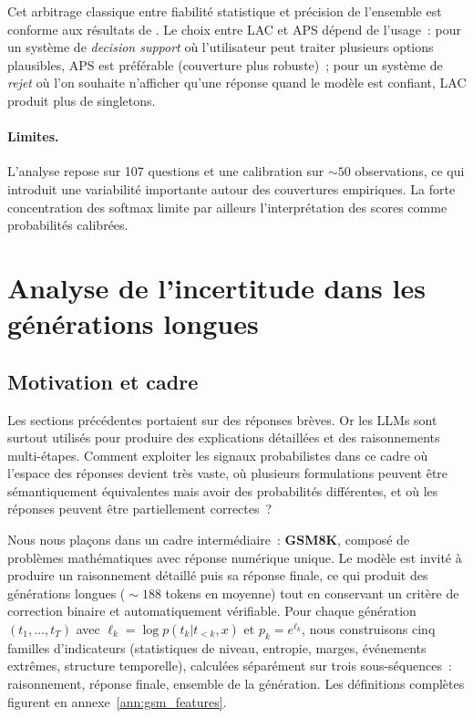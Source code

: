 \documentclass[12pt,a4paper]{article}
\begin{document}
Cet arbitrage classique entre fiabilité statistique et précision de l'ensemble est conforme aux résultats de \citet{ye2024benchmarking}. Le choix entre LAC et APS dépend de l'usage~: pour un système de \emph{decision support} où l'utilisateur peut traiter plusieurs options plausibles, APS est préférable (couverture plus robuste)~; pour un système de \emph{rejet} où l'on souhaite n'afficher qu'une réponse quand le modèle est confiant, LAC produit plus de singletons.

\paragraph{Limites.}
L'analyse repose sur 107 questions et une calibration sur $\sim 50$ observations, ce qui introduit une variabilité importante autour des couvertures empiriques. La forte concentration des softmax limite par ailleurs l'interprétation des scores comme probabilités calibrées.


\section{Analyse de l'incertitude dans les générations longues}
\label{sec:generations_longues}

\subsection{Motivation et cadre}

Les sections précédentes portaient sur des réponses brèves. Or les LLMs sont surtout utilisés pour produire des explications détaillées et des raisonnements multi-étapes. Comment exploiter les signaux probabilistes dans ce cadre où l'espace des réponses devient très vaste, où plusieurs formulations peuvent être sémantiquement équivalentes mais avoir des probabilités différentes, et où les réponses peuvent être partiellement correctes~?

Nous nous plaçons dans un cadre intermédiaire~: \textbf{GSM8K}, composé de problèmes mathématiques avec réponse numérique unique. Le modèle est invité à produire un raisonnement détaillé puis sa réponse finale, ce qui produit des générations longues ($\sim 188$ tokens en moyenne) tout en conservant un critère de correction binaire et automatiquement vérifiable. Pour chaque génération $(t_1, \ldots, t_T)$ avec $\ell_k = \log p(t_k|t_{<k},x)$ et $p_k = e^{\ell_k}$, nous construisons cinq familles d'indicateurs (statistiques de niveau, entropie, marges, événements extrêmes, structure temporelle), calculées séparément sur trois sous-séquences~: raisonnement, réponse finale, ensemble de la génération. Les définitions complètes figurent en annexe~\ref{ann:gsm_features}.
\end{document}
